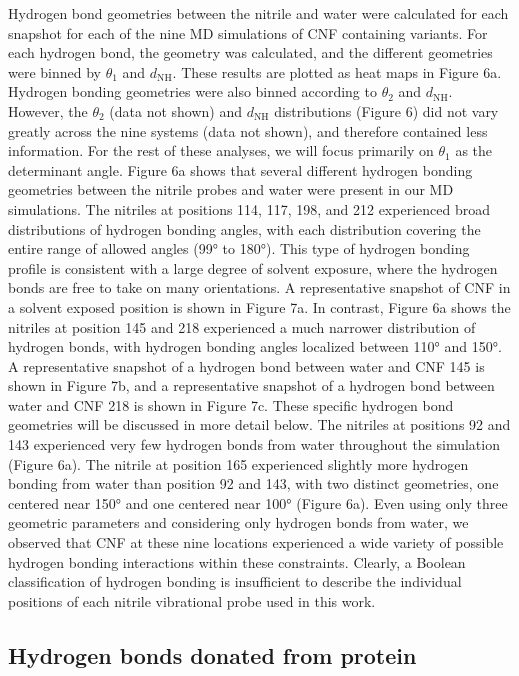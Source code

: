 Hydrogen bond geometries between the nitrile and water were calculated for each snapshot for each of the nine MD simulations of CNF containing variants.
For each hydrogen bond, the geometry was calculated, and the different geometries were binned by $\theta_1$ and $d_{\text{NH}}$.
These results are plotted as heat maps in Figure 6a.
Hydrogen bonding geometries were also binned according to $\theta_2$ and $d_{\text{NH}}$.
However, the $\theta_2$ (data not shown) and $d_{\text{NH}}$ distributions (Figure 6) did not vary greatly across the nine systems (data not shown), and therefore contained less information.
For the rest of these analyses, we will focus primarily on $\theta_1$ as the determinant angle.
Figure 6a shows that several different hydrogen bonding geometries between the nitrile probes and water were present in our MD simulations.
The nitriles at positions 114, 117, 198, and 212 experienced broad distributions of hydrogen bonding angles, with each distribution covering the entire range of allowed angles (\ang{99} to \ang{180}).
This type of hydrogen bonding profile is consistent with a large degree of solvent exposure, where the hydrogen bonds are free to take on many orientations.
A representative snapshot of CNF in a solvent exposed position is shown in Figure 7a.
In contrast, Figure 6a shows the nitriles at position 145 and 218 experienced a much narrower distribution of hydrogen bonds, with hydrogen bonding angles localized between \ang{110} and \ang{150}.
A representative snapshot of a hydrogen bond between water and CNF 145 is shown in Figure 7b, and a representative snapshot of a hydrogen bond between water and CNF 218 is shown in Figure 7c.
These specific hydrogen bond geometries will be discussed in more detail below.
The nitriles at positions 92 and 143 experienced very few hydrogen bonds from water throughout the simulation (Figure 6a).
The nitrile at position 165 experienced slightly more hydrogen bonding from water than position 92 and 143, with two distinct geometries, one centered near \ang{150} and one centered near \ang{100} (Figure 6a).
Even using only three geometric parameters and considering only hydrogen bonds from water, we observed that CNF at these nine locations experienced a wide variety of possible hydrogen bonding interactions within these constraints.
Clearly, a Boolean classification of hydrogen bonding is insufficient to describe the individual positions of each nitrile vibrational probe used in this work. 

\subsection{Hydrogen bonds donated from protein}

